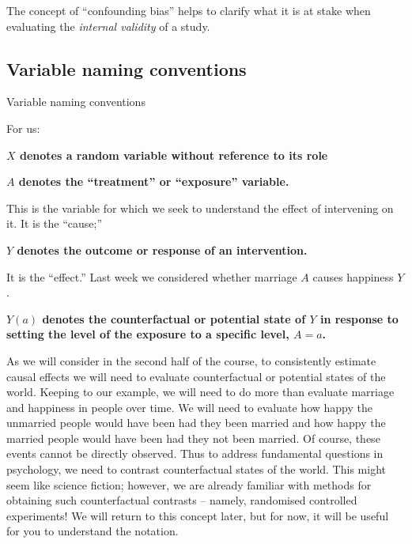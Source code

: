 \documentclass[
  single column]{article}
\begin{document}
The concept of ``confounding bias'' helps to clarify what it is at stake
when evaluating the \emph{internal validity} of a study.

\newpage{}

\subsection{Variable naming
conventions}\label{variable-naming-conventions}

\begin{table}

\caption{\label{tbl-terminology}Variable naming conventions}

\centering{

\terminologylocalconventions

}

\end{table}%

For us:

\textbf{\(X\) denotes a random variable without reference to its role}

\textbf{\(A\) denotes the ``treatment'' or ``exposure'' variable.}

This is the variable for which we seek to understand the effect of
intervening on it. It is the ``cause;''

\textbf{\(Y\) denotes the outcome or response of an intervention.}

It is the ``effect.'' Last week we considered whether marriage \(A\)
causes happiness \(Y\).

\textbf{\(Y(a)\) denotes the counterfactual or potential state of \(Y\)
in response to setting the level of the exposure to a specific level,
\(A=a\).}

As we will consider in the second half of the course, to consistently
estimate causal effects we will need to evaluate counterfactual or
potential states of the world. Keeping to our example, we will need to
do more than evaluate marriage and happiness in people over time. We
will need to evaluate how happy the unmarried people would have been had
they been married and how happy the married people would have been had
they not been married. Of course, these events cannot be directly
observed. Thus to address fundamental questions in psychology, we need
to contrast counterfactual states of the world. This might seem like
science fiction; however, we are already familiar with methods for
obtaining such counterfactual contrasts -- namely, randomised controlled
experiments! We will return to this concept later, but for now, it will
be useful for you to understand the notation.
\end{document}
